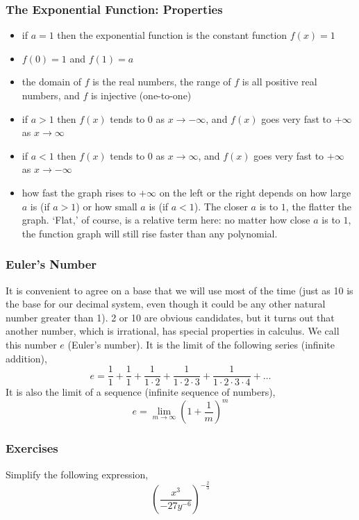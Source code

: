 \documentclass[xcolor=dvipsnames]{beamer}
\begin{document}
\begin{frame}
  \frametitle{The Exponential Function: Properties}
\begin{itemize}
\item<1-> if $a=1$ then the exponential function is the constant function $f(x)=1$
\item<2-> $f(0)=1$ and $f(1)=a$
\item<3-> the domain of $f$ is the real numbers, the range of $f$ is
  all positive real numbers, and $f$ is injective (one-to-one)
\item<4-> if $a>1$ then $f(x)$ tends to $0$ as $x\rightarrow -\infty$, and
  $f(x)$ goes very fast to $+\infty$ as $x\rightarrow \infty$
\item<5-> if $a<1$ then $f(x)$ tends to $0$ as $x\rightarrow \infty$, and
  $f(x)$ goes very fast to $+\infty$ as $x\rightarrow -\infty$
\item<6-> how fast the graph rises to $+\infty$ on the left or the
  right depends on how large $a$ is (if $a>1$) or how small
  $a$ is (if $a<1$). The closer $a$ is to $1$, the flatter the graph.
  `Flat,' of course, is a relative term here: no matter how close $a$
  is to $1$, the function graph will still rise faster than any polynomial.
\end{itemize}
\end{frame}

\begin{frame}
  \frametitle{Euler's Number}
It is convenient to agree on a base that we will use most of the time
(just as 10 is the base for our decimal system, even though it could
be any other natural number greater than 1). 2 or 10 are obvious
candidates, but it turns out that another number, which is irrational,
has special properties in calculus. We call this number $e$ (Euler's
number). It is the limit of the following series (infinite addition),
\begin{equation}
  \label{eq:ohxairei}
    e=\frac{1}{1}+\frac{1}{1}+\frac{1}{1\cdot 2}+\frac{1}{1\cdot 2\cdot
    3}+\frac{1}{1\cdot 2\cdot 3\cdot 4}+\ldots
\end{equation}
It is also the limit of a sequence (infinite sequence of numbers),
\begin{equation}
  \label{eq:eyalachi}
  e=\lim_{m\rightarrow\infty}\left(1+\frac{1}{m}\right)^{m}
\end{equation}
\end{frame}

\begin{frame}
  \frametitle{Exercises}
  {\ubung} Simplify the following expression,
\begin{equation}
  \label{eq:eedeezoh}
  \left(\frac{x^{3}}{-27y^{-6}}\right)^{-\frac{2}{3}}
\end{equation}
\end{frame}
\end{document}
